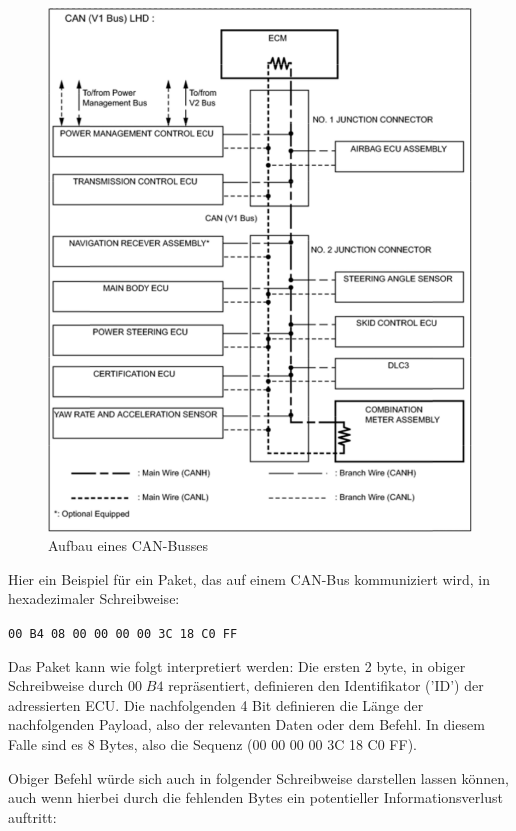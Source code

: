 \documentclass[
    fontsize=12pt,
    headings=small,
    parskip=half,           %
    bibliography=totoc,9
    numbers=noenddot,       %
    open=any,               %
    ]{scrreprt}
\begin{document}
\FloatBarrier
\begin{figure}[h!]
	\centering
  \includegraphics[width=\textwidth,height=\textheight,keepaspectratio]{pic/can-bus.png}
	\caption{Aufbau eines CAN-Busses}
\end{figure}
\FloatBarrier
\newpage


Hier ein Beispiel für ein Paket, das auf einem CAN-Bus kommuniziert wird, in hexadezimaler Schreibweise:

\centerline{\texttt{00 B4 08 00 00 00 00 3C 18 C0 FF}}

Das Paket kann wie folgt interpretiert werden:
Die ersten 2 byte, in obiger Schreibweise durch $00\;B4$ repräsentiert, definieren den Identifikator ('ID') der adressierten ECU. Die nachfolgenden 4 Bit definieren die Länge der nachfolgenden Payload, also der relevanten Daten oder dem Befehl. In diesem Falle sind es 8 Bytes, also die Sequenz (00 00 00 00 3C 18 C0 FF).

Obiger Befehl würde sich auch in folgender Schreibweise darstellen lassen können, auch wenn hierbei durch die fehlenden Bytes ein potentieller Informationsverlust auftritt:
\end{document}
